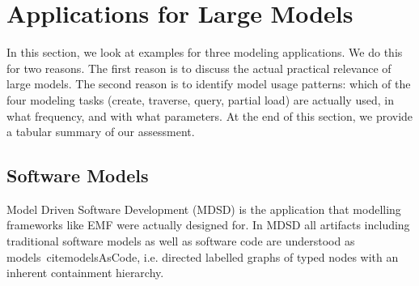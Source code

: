 \section{Applications for Large Models}
\label{sec:applications}

In this section, we look at examples for three modeling applications. We do this for two reasons. The first reason is to discuss the actual practical relevance of large models. The second reason is to identify model usage patterns: which of the four modeling tasks (create, traverse, query, partial load) are actually used, in what frequency, and with what parameters. At the end of this section, we provide a tabular summary of our assessment.

%
%
%

\subsection{Software Models}
Model Driven Software Development (MDSD) is the application that modelling frameworks like EMF were actually designed for. In MDSD all artifacts including traditional software models as well as software code are understood as models~cite{modelsAsCode}, i.e. directed labelled graphs of typed nodes with an inherent containment hierarchy. 

